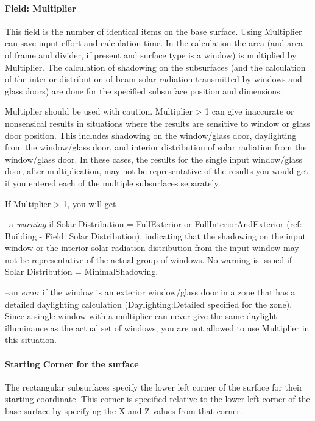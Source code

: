\paragraph{Field: Multiplier}\label{field-multiplier-5}

This field is the number of identical items on the base surface. Using Multiplier can save input effort and calculation time. In the calculation the area (and area of frame and divider, if present and surface type is a window) is multiplied by Multiplier. The calculation of shadowing on the subsurfaces (and the calculation of the interior distribution of beam solar radiation transmitted by windows and glass doors) are done for the specified subsurface position and dimensions.

Multiplier should be used with caution. Multiplier \textgreater{} 1 can give inaccurate or nonsensical results in situations where the results are sensitive to window or glass door position. This includes shadowing on the window/glass door, daylighting from the window/glass door, and interior distribution of solar radiation from the window/glass door. In these cases, the results for the single input window/glass door, after multiplication, may not be representative of the results you would get if you entered each of the multiple subsurfaces separately.

If Multiplier \textgreater{} 1, you will get

--a \emph{warning} if Solar Distribution = FullExterior or FullInteriorAndExterior (ref: Building - Field: Solar Distribution), indicating that the shadowing on the input window or the interior solar radiation distribution from the input window may not be representative of the actual group of windows. No warning is issued if Solar Distribution = MinimalShadowing.

--an \emph{error} if the window is an exterior window/glass door in a zone that has a detailed daylighting calculation (Daylighting:Detailed specified for the zone). Since a single window with a multiplier can never give the same daylight illuminance as the actual set of windows, you are not allowed to use Multiplier in this situation.

\paragraph{Starting Corner for the surface}\label{starting-corner-for-the-surface-14}

The rectangular subsurfaces specify the lower left corner of the surface for their starting coordinate. This corner is specified relative to the lower left corner of the base surface by specifying the X and Z values from that corner.

